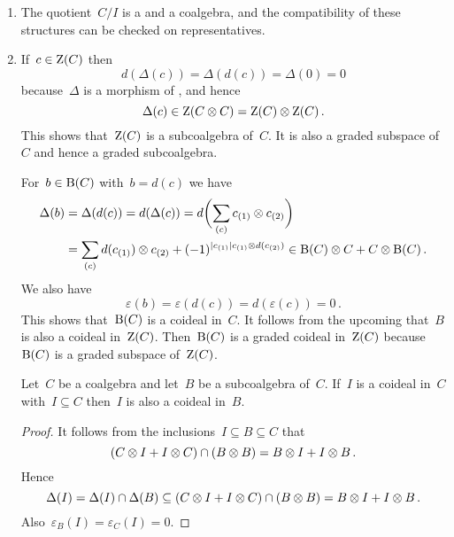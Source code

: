 \begin{enumerate}[start=3]
  \item
    The quotient~$C/I$ is a {\dgv} and a coalgebra, and the compatibility of these structures can be checked on representatives.
  \item
    If~$c \in \operatorname{Z}(C)$ then
    \[
      d(\Delta(c))
      =
      \Delta(d(c))
      =
      \Delta(0)
      =
      0
    \]
    because~$\Delta$ is a morphism of {\dgvs}, and hence
    \[
      \Delta(c)
      \in
      \operatorname{Z}(C \otimes C)
      =
      \operatorname{Z}(C) \otimes \operatorname{Z}(C) \,.
    \]
    This shows that~$\operatorname{Z}(C)$ is a subcoalgebra of~$C$.
    It is also a graded subspace of~$C$ and hence a graded subcoalgebra.

    For~$b \in \operatorname{B}(C)$ with~$b = d(c)$ we have
    \begin{align*}
      \Delta(b)
      &=
      \Delta(d(c))
      =
      d(\Delta(c))
      =
      d\biggl( \sum_{(c)} c_{(1)} \otimes c_{(2)} \biggr)
      \\
      &=
      \sum_{(c)}
      d(c_{(1)}) \otimes c_{(2)}
      +
      (-1)^{\lvert c_{(1)}\rvert c_{(1)} \otimes d(c_{(2)})}
      \in
      \operatorname{B}(C) \otimes C + C \otimes \operatorname{B}(C) \,.
    \end{align*}
    We also have
    \[
      \varepsilon(b)
      =
      \varepsilon(d(c))
      =
      d(\varepsilon(c))
      =
      0 \,.
    \]
    This shows that~$\operatorname{B}(C)$ is a coideal in~$C$.
    It follows from the upcoming  that~$B$ is also a coideal in~$\operatorname{Z}(C)$.
    Then~$\operatorname{B}(C)$ is a graded coideal in~$\operatorname{Z}(C)$ because~$\operatorname{B}(C)$ is a graded subspace of~$\operatorname{Z}(C)$.

    \begin{lemma}
      \label{restriction of coideals}
      Let~$C$ be a coalgebra and let~$B$ be a subcoalgebra of~$C$.
      If~$I$ is a coideal in~$C$ with~$I \subseteq C$ then~$I$ is also a coideal in~$B$.
    \end{lemma}

    \begin{proof}
      It follows from the inclusions~$I \subseteq B \subseteq C$ that
      \[
        (C \otimes I + I \otimes C) \cap (B \otimes B)
        =
        B \otimes I + I \otimes B \,.
      \]
      Hence
      \[
        \Delta(I)
        =
        \Delta(I) \cap \Delta(B)
        \subseteq
        (C \otimes I + I \otimes C) \cap (B \otimes B)
        =
        B \otimes I + I \otimes B \,.
      \]
      Also~$\varepsilon_B(I) = \varepsilon_C(I) = 0$.
    \end{proof}
\end{enumerate}





